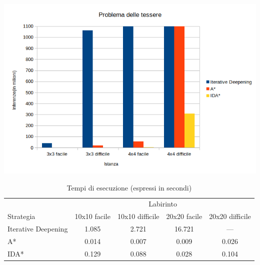 \documentclass[a4paper,oneside,12pt]{book}
\begin{document}
\begin{center}
        \includegraphics[height=0.65\textwidth]{tessereInferenze}

        \restoregeometry
        \newpage
        \restoregeometry
    \end{center}

    \begin{table}
        \centering
        \begin{tabular}{l c c c c}
            \toprule %
            & \multicolumn{4}{c}{Labirinto} \\ %
            \cmidrule(l){2-5} %
            Strategia & 10x10 facile & 10x10 difficile & 20x20 facile & 20x20 difficile\\ %
            \midrule %
            Iterative Deepening & 1.085 & 2.721 & 16.721 & --- \\ %
            A* & 0.014 & 0.007 & 0.009 & 0.026\\ %
            IDA* & 0.129 & 0.088 & 0.028 & 0.104 \\ %

            \bottomrule
        \end{tabular}
        \caption{Tempi di esecuzione (espressi in secondi)}
    \end{table}
\end{document}
